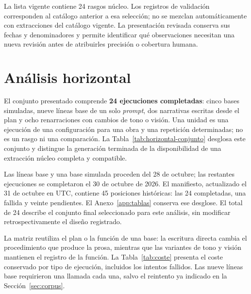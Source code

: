 La lista vigente contiene 24 rasgos núcleo. Los registros de validación corresponden al catálogo
anterior a esa selección; no se mezclan automáticamente con extracciones del catálogo vigente.
La presentación revisada conserva sus fechas y denominadores y permite identificar qué observaciones
necesitan una nueva revisión antes de atribuirles precisión o cobertura humana.

\section{Análisis horizontal}\label{sec:resultados-horizontal}

El conjunto presentado comprende \textbf{24 ejecuciones completadas}: cinco bases simuladas,
nueve líneas base de un solo \textit{prompt}, dos narrativas escritas desde el plan y ocho
renarraciones con cambios de tono o visión. Una unidad es una ejecución de una configuración para
una obra y una repetición determinadas; no es un rasgo ni una comparación. La
Tabla~\ref{tab:horizontal-conjunto} desglosa este conjunto y distingue la generación terminada de
la disponibilidad de una extracción núcleo completa y compatible.

\begin{table}[htb]
  \centering
  \caption{Conjunto horizontal y extracciones localizadas (revisión, 2026-11-07)}
  \label{tab:horizontal-conjunto}
  \small
  \setlength{\tabcolsep}{4pt}
  
\end{table}

Las líneas base y una base simulada proceden del 28 de octubre; las restantes ejecuciones se
completaron el 30 de octubre de 2026. El manifiesto, actualizado el 31 de octubre en UTC, contiene
45 posiciones históricas: las 24 completadas, una fallida y veinte pendientes. El
Anexo~\ref{app:tablas} conserva ese desglose. El total de 24 describe el conjunto final seleccionado
para este análisis, sin modificar retrospectivamente el diseño registrado.

La matriz reutiliza el plan o la función de una base: la escritura directa cambia el procedimiento
que produce la prosa, mientras que las variantes de tono y visión mantienen el registro de la
función. La Tabla~\ref{tab:coste} presenta el coste conservado por tipo de ejecución, incluidos los
intentos fallidos. Las nueve líneas base requirieron una llamada cada una, salvo el reintento ya
indicado en la Sección~\ref{sec:corpus}.

